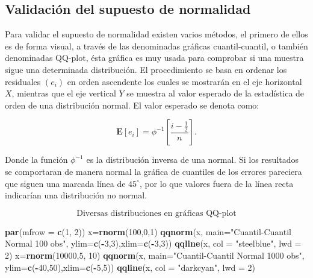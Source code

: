 \documentclass[a4paper,oneside,openany]{book}
\newenvironment{Shaded}{\begin{snugshade}}{\end{snugshade}}
\newcommand{\KeywordTok}[1]{\textcolor[rgb]{0.13,0.29,0.53}{\textbf{#1}}}
\newcommand{\DataTypeTok}[1]{\textcolor[rgb]{0.13,0.29,0.53}{#1}}
\newcommand{\DecValTok}[1]{\textcolor[rgb]{0.00,0.00,0.81}{#1}}
\newcommand{\StringTok}[1]{\textcolor[rgb]{0.31,0.60,0.02}{#1}}
\newcommand{\OperatorTok}[1]{\textcolor[rgb]{0.81,0.36,0.00}{\textbf{#1}}}
\newcommand{\NormalTok}[1]{#1}
\begin{document}
\subsection{Validación del supuesto de
normalidad}\label{validaciuxf3n-del-supuesto-de-normalidad}

Para validar el supuesto de normalidad existen varios métodos, el
primero de ellos es de forma visual, a través de las denominadas
gráficas cuantil-cuantil, o también denominadas QQ-plot, ésta gráfica es
muy usada para comprobar si una muestra sigue una determinada
distribución. El procedimiento se basa en ordenar los residuales
\((e_{i})\) en orden ascendente los cuales se mostrarán en el eje
horizontal \(X\), mientras que el eje vertical \(Y\) se muestra al valor
esperado de la estadística de orden de una distribución normal. El valor
esperado se denota como:

\[\mathbf{E}[e_{i}]=\phi^{-1}\left[\frac{i-\frac{1}{2}}{n}\right].\]

Donde la función \(\phi^{-1}\) es la distribución inversa de una normal.
Si los resultados se comportaran de manera normal la gráfica de
cuantiles de los errores pareciera que siguen una marcada línea de
\(45^\circ\), por lo que valores fuera de la línea recta indicarían una
distribución no normal.

\[\mbox{Diversas distribuciones en gráficas QQ-plot}\]

\begin{Shaded}
\begin{Highlighting}[]
\KeywordTok{par}\NormalTok{(}\DataTypeTok{mfrow =} \KeywordTok{c}\NormalTok{(}\DecValTok{1}\NormalTok{, }\DecValTok{2}\NormalTok{))}
\NormalTok{x=}\KeywordTok{rnorm}\NormalTok{(}\DecValTok{100}\NormalTok{,}\DecValTok{0}\NormalTok{,}\DecValTok{1}\NormalTok{) }
\KeywordTok{qqnorm}\NormalTok{(x, }\DataTypeTok{main=}\StringTok{"Cuantil-Cuantil Normal 100 obs"}\NormalTok{, }\DataTypeTok{ylim=}\KeywordTok{c}\NormalTok{(}\OperatorTok{-}\DecValTok{3}\NormalTok{,}\DecValTok{3}\NormalTok{),}\DataTypeTok{xlim=}\KeywordTok{c}\NormalTok{(}\OperatorTok{-}\DecValTok{3}\NormalTok{,}\DecValTok{3}\NormalTok{)) }
\KeywordTok{qqline}\NormalTok{(x, }\DataTypeTok{col =} \StringTok{"steelblue"}\NormalTok{, }\DataTypeTok{lwd =} \DecValTok{2}\NormalTok{)}
\NormalTok{x=}\KeywordTok{rnorm}\NormalTok{(}\DecValTok{10000}\NormalTok{,}\DecValTok{5}\NormalTok{, }\DecValTok{10}\NormalTok{) }
\KeywordTok{qqnorm}\NormalTok{(x, }\DataTypeTok{main=}\StringTok{"Cuantil-Cuantil Normal 1000 obs"}\NormalTok{, }\DataTypeTok{ylim=}\KeywordTok{c}\NormalTok{(}\OperatorTok{-}\DecValTok{40}\NormalTok{,}\DecValTok{50}\NormalTok{),}\DataTypeTok{xlim=}\KeywordTok{c}\NormalTok{(}\OperatorTok{-}\DecValTok{5}\NormalTok{,}\DecValTok{5}\NormalTok{)) }
\KeywordTok{qqline}\NormalTok{(x, }\DataTypeTok{col =} \StringTok{"darkcyan"}\NormalTok{, }\DataTypeTok{lwd =} \DecValTok{2}\NormalTok{)}
\end{Highlighting}
\end{Shaded}
\end{document}
